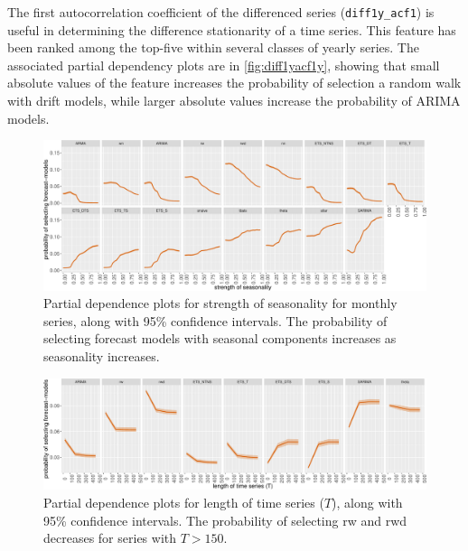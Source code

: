 \documentclass[11pt,a4paper,]{article}
\begin{document}
The first autocorrelation coefficient of the differenced series (\texttt{diff1y\_acf1}) is useful in determining the difference stationarity of a time series. This feature has been ranked among the top-five within several classes of yearly series. The associated partial dependency plots are in \autoref{fig:diff1yacf1y}, showing that small absolute values of the feature increases the probability of selection a random walk with drift models, while larger absolute values increase the probability of ARIMA models.

\begin{figure}[!b]

{\centering \includegraphics[width=\textwidth]{figure/pdpmonthlyseasonality-1} 

}

\caption{Partial dependence plots for strength of seasonality for monthly series, along with 95\% confidence intervals. The probability of selecting forecast models with seasonal components increases as seasonality increases.}\label{fig:pdpmonthlyseasonality}
\end{figure}

\begin{figure}[!b]

{\centering \includegraphics[width=\textwidth]{figure/pdpmonthlyT-1} 

}

\caption{Partial dependence plots for length of time series ($T$), along with 95\% confidence intervals. The probability of selecting rw and rwd decreases for series with $T>150$.}\label{fig:pdpmonthlyT}
\end{figure}
\end{document}

